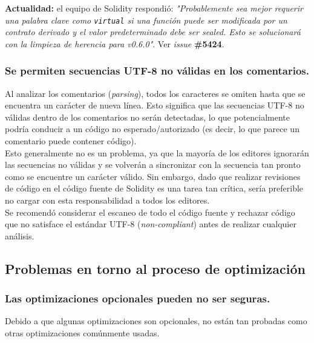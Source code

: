\textbf{Actualidad:} el equipo de Solidity respondió: \textit{"Probablemente sea mejor requerir una palabra clave como \texttt{virtual} si una función puede ser modificada por un contrato derivado y el valor predeterminado debe ser sealed. Esto se solucionará con la limpieza de herencia para v0.6.0"}\cite{GHProject9}. Ver \textit{issue} \textbf{\#5424}\cite{GHI5424}.\\

\subsubsection{Se permiten secuencias UTF-8 no válidas en los comentarios.}

Al analizar los comentarios (\textit{parsing}), todos los caracteres se omiten hasta que se encuentra un carácter de nueva línea. Esto significa que las secuencias UTF-8 no válidas dentro de los comentarios no serán detectadas, lo que potencialmente podría conducir a un código no esperado/autorizado (es decir, lo que parece un comentario puede contener código).\\

Esto generalmente no es un problema, ya que la mayoría de los editores ignorarán las secuencias no válidas y se volverán a sincronizar con la secuencia tan pronto como se encuentre un carácter válido. Sin embargo, dado que realizar revisiones de código en el código fuente de Solidity es una tarea tan crítica, sería preferible no cargar con esta responsabilidad a todos los editores.\\

Se recomendó considerar el escaneo de todo el código fuente y rechazar código que no satisface el estándar UTF-8 (\textit{non-compliant}) antes de realizar cualquier análisis.\\

\subsection{Problemas en torno al proceso de optimización}

\subsubsection{Las optimizaciones opcionales pueden no ser seguras.}

Debido a que algunas optimizaciones son opcionales, no están tan probadas como otras optimizaciones comúnmente usadas.\\

